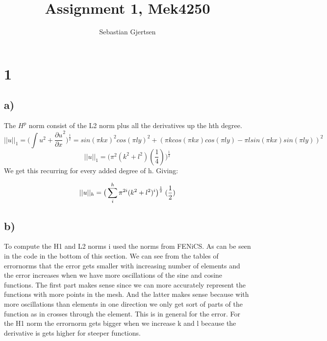 \documentclass[a4paper,norsk]{article}
\title{Assignment 1, Mek4250}
\author{Sebastian Gjertsen}
\begin{document}
\maketitle
\section*{1}
\subsection*{a)}
The $H^p$ norm consist of the L2 norm plus all the derivatives up the hth degree.
$$ \vert \vert u \vert \vert_1 = \big( \int u^2 + \frac{\partial u}{\partial x}^2\big)^\frac{1}{2} = sin(\pi kx)^2 cos(\pi ly)^2  +  (\pi k cos(\pi kx)cos(\pi ly) - \pi l sin(\pi kx)sin(\pi ly))^2$$
$$ \vert \vert u \vert \vert_1 = \big( \pi^2 (k^2+l^2)(\frac{1}{4}) \big) ^\frac{1}{2}$$ 
We get this recurring for every added degree of h. Giving:

$$ \vert \vert u \vert \vert_h = \big(\sum_i^h  \pi^{2i} (k^2+l^2)^i\big)^\frac{1}{2} \hspace{1mm} ( \frac{1}{2})$$





\subsection*{b)}
To compute the H1 and L2 norms i used the norms from FENiCS. As can be seen in the code in the bottom of this section.
We can see from the tables of errornorms that the error gets smaller with increasing number of elements and the error increases when we have more oscillations of the sine and cosine functions. The first part makes sense since we can more accurately represent the functions with more points in the mesh. And the latter makes sense because with more oscillations than elements in one direction we only get sort of parts of the function as in crosses through the element. This is in general for the error. \newline
For the H1 norm the errornorm gets bigger when we increase k and l because the derivative is gets higher for steeper functions.
\end{document}
